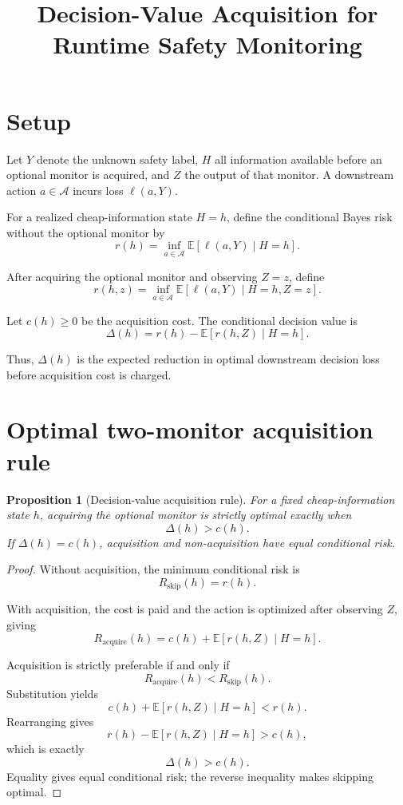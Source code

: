 \documentclass[11pt]{article}
\title{Decision-Value Acquisition for Runtime Safety Monitoring}
\author{}
\date{}
\newtheorem{proposition}{Proposition}
\begin{document}
\maketitle

\section{Setup}

Let \(Y\) denote the unknown safety label, \(H\) all information available
before an optional monitor is acquired, and \(Z\) the output of that monitor.
A downstream action \(a\in\mathcal{A}\) incurs loss \(\ell(a,Y)\).

For a realized cheap-information state \(H=h\), define the conditional Bayes
risk without the optional monitor by
\[
r(h)=\inf_{a\in\mathcal{A}}
\mathbb{E}\!\left[\ell(a,Y)\mid H=h\right].
\]

After acquiring the optional monitor and observing \(Z=z\), define
\[
r(h,z)=\inf_{a\in\mathcal{A}}
\mathbb{E}\!\left[\ell(a,Y)\mid H=h,Z=z\right].
\]

Let \(c(h)\geq 0\) be the acquisition cost. The conditional decision value is
\[
\Delta(h)=r(h)-\mathbb{E}\!\left[r(h,Z)\mid H=h\right].
\]

Thus, \(\Delta(h)\) is the expected reduction in optimal downstream decision
loss before acquisition cost is charged.

\section{Optimal two-monitor acquisition rule}

\begin{proposition}[Decision-value acquisition rule]
For a fixed cheap-information state \(h\), acquiring the optional monitor is
strictly optimal exactly when
\[
\Delta(h)>c(h).
\]
If \(\Delta(h)=c(h)\), acquisition and non-acquisition have equal conditional
risk.
\end{proposition}

\begin{proof}
Without acquisition, the minimum conditional risk is
\[
R_{\mathrm{skip}}(h)=r(h).
\]

With acquisition, the cost is paid and the action is optimized after observing
\(Z\), giving
\[
R_{\mathrm{acquire}}(h)
=
c(h)+\mathbb{E}\!\left[r(h,Z)\mid H=h\right].
\]

Acquisition is strictly preferable if and only if
\[
R_{\mathrm{acquire}}(h)<R_{\mathrm{skip}}(h).
\]
Substitution yields
\[
c(h)+\mathbb{E}\!\left[r(h,Z)\mid H=h\right]<r(h).
\]
Rearranging gives
\[
r(h)-\mathbb{E}\!\left[r(h,Z)\mid H=h\right]>c(h),
\]
which is exactly
\[
\Delta(h)>c(h).
\]
Equality gives equal conditional risk; the reverse inequality makes skipping
optimal.
\end{proof}
\end{document}

